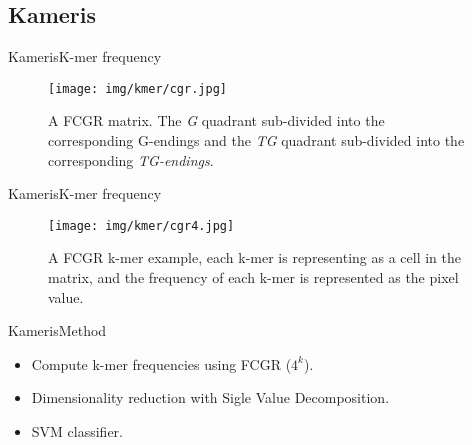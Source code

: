 \documentclass[10pt]{beamer}
\newcommand{\1}{
        	\setbeamertemplate{background}{
        		\texttt{[image: img/1]}
        		\tikz[overlay] \fill[fill opacity=0.75,fill=white] (0,0) rectangle (-\paperwidth,\paperheight);
        	}
}
\begin{document}
\subsection{Kameris}

\begin{frame}{Kameris}{K-mer frequency}
	\begin{figure}[h]
		\texttt{[image: img/kmer/cgr.jpg]}
		\caption{A FCGR matrix. The \textit{G} quadrant sub-divided into the corresponding G-endings and the \textit{TG} quadrant sub-divided into the corresponding \textit{TG-endings}.}
		\label{fig:cgr}
	\end{figure}
\end{frame}

\begin{frame}{Kameris}{K-mer frequency}
	\begin{figure}[h]
		\texttt{[image: img/kmer/cgr4.jpg]}
		\caption{A FCGR k-mer example, each k-mer is representing as a cell in the matrix, and the frequency of each k-mer is represented as the pixel value.}
		\label{fig:cgr3}
	\end{figure}
\end{frame}

\begin{frame}{Kameris}{Method}
	\begin{block}{}
		\begin{itemize}
			\item Compute k-mer frequencies using FCGR ($4^k$).
			\item Dimensionality reduction with Sigle Value Decomposition.
			\item SVM classifier.
		\end{itemize}
	\end{block}
\end{frame}
\end{document}
